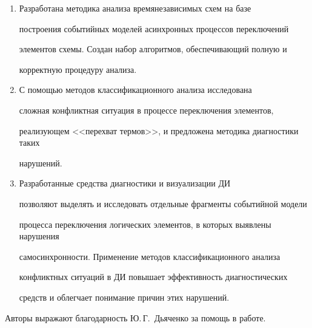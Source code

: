 \begin{enumerate}[1.]


      \item Разработана методика анализа времянезависимых схем на базе 


по\-стро\-ения событийных моделей асинхронных процессов переключений 


элементов схемы. Создан набор алгоритмов, обеспечивающий полную и 


корректную процедуру анализа.


      \item С помощью методов классификационного анализа исследована 


сложная конфликтная ситуация в процессе переключения элементов,  


реализующем <<перехват термов>>, и предложена методика диагностики таких 


нарушений.


      \item Разработанные средства диагностики и визуализации ДИ 


позволяют выделять и исследовать отдельные фрагменты событийной модели 


процесса переключения логических элементов, в которых выявлены нарушения 


самосинхронности.  Применение методов классификационного анализа 


конфликтных ситуаций в ДИ повышает эффективность диагностических 


средств и облегчает понимание причин этих нарушений.


      \end{enumerate}


      


      \smallskip


      Авторы выражают благодарность Ю.\,Г.~Дьяченко за помощь в работе.


      


